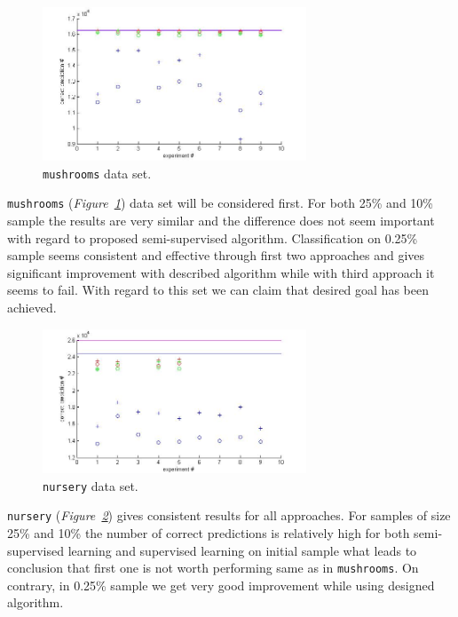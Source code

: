 \documentclass[12pt, a4paper, pdflatex]{report}
\begin{document}
\begin{figure}[htbp]
	\centering
	\includegraphics[width=0.7\textwidth]{graphics/figures/fig1.jpg}
	\begin{tiny}
		\caption{\small \texttt{mushrooms} data set.\label{img:mushrooms}}
	\end{tiny}
\end{figure}
\texttt{mushrooms} (\emph{Figure~\ref{img:mushrooms}}) data set will be considered first. For both 25\% and 10\% sample the results are very similar and the difference does not seem important with regard to proposed semi-supervised algorithm. Classification on 0.25\% sample seems consistent and effective through first two approaches and gives significant improvement with described algorithm while with third approach it seems to fail. With regard to this set we can claim that desired goal has been achieved.\\


\begin{figure}[htbp]
	\centering
	\includegraphics[width=0.7\textwidth]{graphics/figures/fig2.jpg}
	\begin{tiny}
		\caption{\small \texttt{nursery} data set.\label{img:nursery}}
	\end{tiny}
\end{figure}

\texttt{nursery} (\emph{Figure~\ref{img:nursery}}) gives consistent results for all approaches. For samples of size 25\% and 10\% the number of correct predictions is relatively high for both semi-supervised learning and supervised learning on initial sample what leads to conclusion that first one is not worth performing same as in \texttt{mushrooms}. On contrary, in 0.25\% sample we get very good improvement while using designed algorithm.\\
\end{document}
